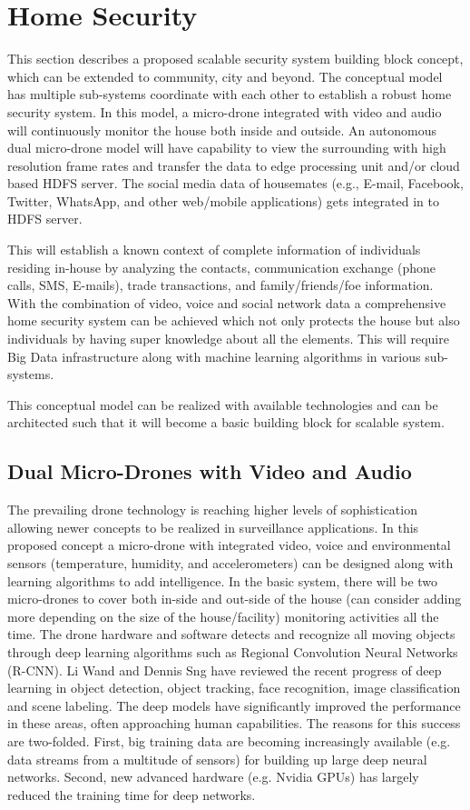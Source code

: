 \documentclass[sigconf]{acmart}
\begin{document}
\section{Home Security}
This section describes a proposed scalable security system building block concept, which can be extended to community, city and beyond.  The conceptual model has multiple sub-systems coordinate with each other to establish a robust home security system. In this model, a micro-drone integrated with video and audio will continuously monitor the house both inside and outside. An autonomous dual micro-drone model will have capability to view the surrounding with high resolution frame rates and transfer the data to edge processing unit and/or cloud based HDFS server. The social media data of housemates (e.g., E-mail, Facebook, Twitter, WhatsApp, and other web/mobile applications) gets integrated in to HDFS server.

This will establish a known context of complete information of individuals residing in-house by analyzing the contacts, communication exchange (phone calls, SMS, E-mails), trade transactions, and family/friends/foe information. With the combination of video, voice and social network data a comprehensive home security system can be achieved which not only protects the house but also individuals by having super knowledge about all the elements. This will require Big Data infrastructure along with machine learning algorithms in various sub-systems.

This conceptual model can be realized with available technologies and can be architected such that it will become a basic building block for scalable system.

\subsection{Dual Micro-Drones with Video and Audio}
The prevailing drone technology is reaching higher levels of sophistication allowing newer concepts to be realized in surveillance applications\cite{Labs2016}. In this proposed concept a micro-drone with integrated video, voice and environmental sensors (temperature, humidity, and accelerometers) can be designed along with learning algorithms to add intelligence. In the basic system, there will be two micro-drones to cover both in-side and out-side of the house (can consider adding more depending on the size of the house/facility) monitoring activities all the time. The drone hardware and software detects and recognize all moving objects through deep learning algorithms such as Regional Convolution Neural Networks (R-CNN). Li Wand and Dennis Sng\cite{Wang2015} have reviewed the recent progress of deep learning in object detection, object tracking, face recognition, image classification and scene labeling. The deep models have significantly improved the performance in these areas, often approaching human capabilities. The reasons for this success are two-folded. First, big training data are becoming increasingly available (e.g. data streams from a multitude of sensors) for building up large deep neural networks. Second, new advanced hardware (e.g. Nvidia GPUs) has largely reduced the training time for deep networks. 
\end{document}
